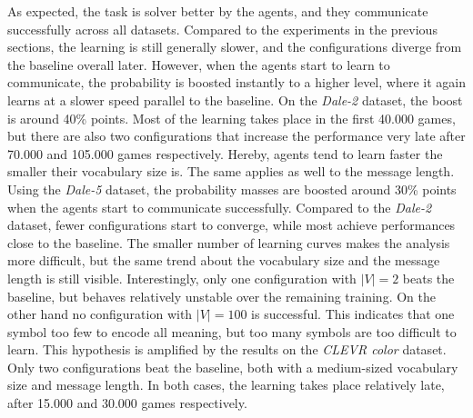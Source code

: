 As expected, the task is solver better by the agents, and they communicate successfully across all datasets.
Compared to the experiments in the previous sections, the learning is still generally slower, and the configurations diverge from the baseline overall later.
However, when the agents start to learn to communicate, the probability is boosted instantly to a higher level, where it again learns at a slower speed parallel to the baseline.
On the \emph{Dale-2} dataset, the boost is around 40\% points.
Most of the learning takes place in the first 40.000 games, but there are also two configurations that increase the performance very late after 70.000 and 105.000 games respectively.
Hereby, agents tend to learn faster the smaller their vocabulary size is.
The same applies as well to the message length.
Using the \emph{Dale-5} dataset, the probability masses are boosted around 30\% points when the agents start to communicate successfully.
Compared to the \emph{Dale-2} dataset, fewer configurations start to converge, while most achieve performances close to the baseline.
The smaller number of learning curves makes the analysis more difficult, but the same trend about the vocabulary size and the message length is still visible.
Interestingly, only one configuration with $|V|=2$ beats the baseline, but behaves relatively unstable over the remaining training.
On the other hand no configuration with $|V|=100$ is successful.
This indicates that one symbol too few to encode all meaning, but too many symbols are too difficult to learn.
This hypothesis is amplified by the results on the \emph{CLEVR color} dataset.
Only two configurations beat the baseline, both with a medium-sized vocabulary size and message length.
In both cases, the learning takes place relatively late, after 15.000 and 30.000 games respectively.

